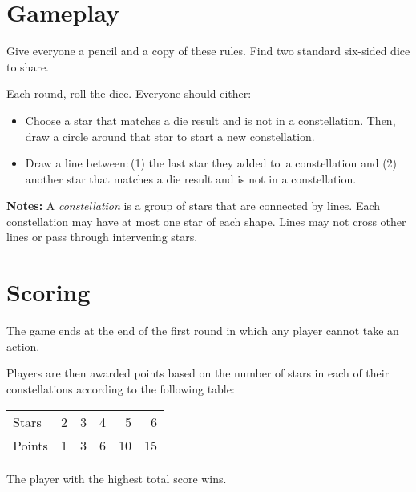 \section*{Gameplay}
%

Give everyone a pencil and a copy of these rules. Find two standard six-sided dice to share.

Each round, roll the dice. Everyone should either:
\begin{itemize}[leftmargin=*]
	\item Choose a star that matches a die result and is not in a constellation. Then, draw a circle around that star to start a new constellation.%
	\item Draw a line between:\,(1) the last star they added to~a constellation and (2) another star that matches a die result and is not in a constellation.
\end{itemize}


\vfill

\textbf{Notes:} A \emph{constellation} is a group of stars that are connected by lines. Each constellation may have at most one star of each shape. Lines may not cross other lines or pass through intervening stars.\vfill\null\columnbreak

\section*{Scoring}
The game ends at the end of the first round in which any player cannot take an action.

Players are then awarded points based on the number of stars in each of their constellations according to the following table:

\vspace{-1.35ex}

\begin{center}
\begin{tabular}{l rrrrr} \toprule[0.5pt]
Stars & 2 & 3 & 4 & 5 & 6 \\
Points & \phantom{1}1 & \phantom{1}3 &\phantom{1}6 & 10 & 15 \\ \bottomrule[0.5pt]
\end{tabular}
\end{center}

\vspace{-1.35ex}

The player with the highest total score wins.
